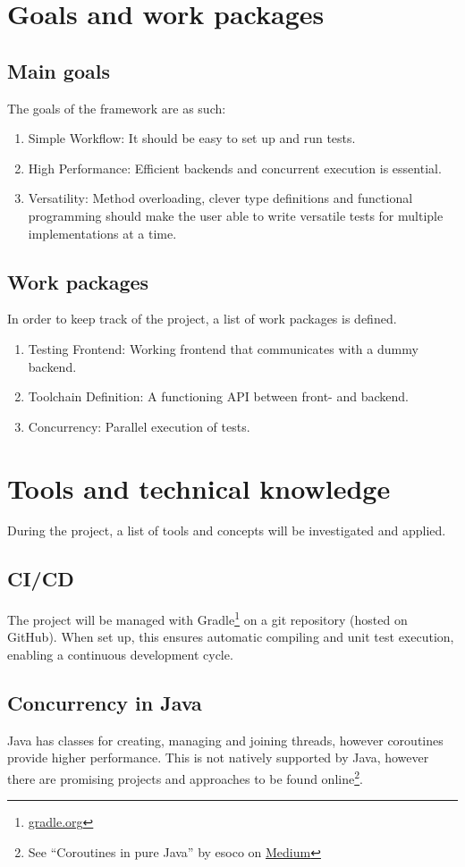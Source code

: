 \documentclass[a4paper, english]{article}
\numberwithin{equation}{section}
\begin{document}
\section{Goals and work packages}
\subsection{Main goals}
The goals of the framework are as such:
\begin{enumerate}
    \item Simple Workflow: It should be easy to set up and run tests.
    \item High Performance: Efficient backends and concurrent execution is essential.
    \item Versatility: Method overloading, clever type definitions and functional programming should make the user able to write versatile tests for multiple implementations at a time.
\end{enumerate}
\subsection{Work packages}
In order to keep track of the project, a list of work packages is defined.
\begin{enumerate}
    \item Testing Frontend: Working frontend that communicates with a dummy backend.
    \item Toolchain Definition: A functioning API between front- and backend.
    \item Concurrency: Parallel execution of tests.
\end{enumerate}
\section{Tools and technical knowledge}
During the project, a list of tools and concepts will be investigated and applied.
\subsection{CI/CD}
The project will be managed with Gradle\footnote{\href{https://gradle.org/}{gradle.org}} on a git repository (hosted on GitHub). When set up, this ensures automatic compiling and unit test execution, enabling a continuous development cycle.
\subsection{Concurrency in Java}
Java has classes for creating, managing and joining threads, however coroutines provide higher performance. This is not natively supported by Java, however there are promising projects and approaches to be found online\footnote{See ``Coroutines in pure Java'' by esoco on \href{https://medium.com/@esocogmbh/coroutines-in-pure-java-65661a379c85}{Medium}}.
\end{document}
